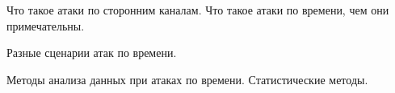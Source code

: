 Что такое атаки по сторонним каналам. Что такое атаки по времени, чем они примечательны.

Разные сценарии атак по времени. \cite{kek}

Методы анализа данных при атаках по времени. Статистические методы.

